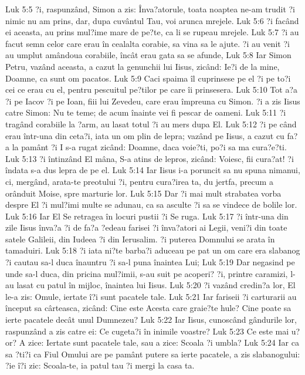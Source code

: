 Luk 5:5  ?i, raspunzând, Simon a zis: Înva?atorule, toata noaptea ne-am trudit ?i nimic nu am prins, dar, dupa cuvântul Tau, voi arunca mrejele.
Luk 5:6  ?i facând ei aceasta, au prins mul?ime mare de pe?te, ca li se rupeau mrejele.
Luk 5:7  ?i au facut semn celor care erau în cealalta corabie, sa vina sa le ajute. ?i au venit ?i au umplut amândoua corabiile, încât erau gata sa se afunde,
Luk 5:8  Iar Simon Petru, vazând aceasta, a cazut la genunchii lui Iisus, zicând: Ie?i de la mine, Doamne, ca sunt om pacatos.
Luk 5:9  Caci spaima îl cuprinsese pe el ?i pe to?i cei ce erau cu el, pentru pescuitul pe?tilor pe care îi prinsesera.
Luk 5:10  Tot a?a ?i pe Iacov ?i pe Ioan, fiii lui Zevedeu, care erau împreuna cu Simon. ?i a zis Iisus catre Simon: Nu te teme; de acum înainte vei fi pescar de oameni.
Luk 5:11  ?i tragând corabiile la ?arm, au lasat totul ?i au mers dupa El.
Luk 5:12  ?i pe când erau într-una din ceta?i, iata un om plin de lepra; vazând pe Iisus, a cazut cu fa?a la pamânt ?i I s-a rugat zicând: Doamne, daca voie?ti, po?i sa ma cura?e?ti.
Luk 5:13  ?i întinzând El mâna, S-a atins de lepros, zicând: Voiesc, fii cura?at! ?i îndata s-a dus lepra de pe el.
Luk 5:14  Iar Iisus i-a poruncit sa nu spuna nimanui, ci, mergând, arata-te preotului ?i, pentru cura?irea ta, du jertfa, precum a orânduit Moise, spre marturie lor.
Luk 5:15  Dar ?i mai mult strabatea vorba despre El ?i mul?imi multe se adunau, ca sa asculte ?i sa se vindece de bolile lor.
Luk 5:16  Iar El Se retragea în locuri pustii ?i Se ruga.
Luk 5:17  ?i într-una din zile Iisus înva?a ?i de fa?a ?edeau farisei ?i înva?atori ai Legii, veni?i din toate satele Galileii, din Iudeea ?i din Ierusalim. ?i puterea Domnului se arata în tamaduiri.
Luk 5:18  ?i iata ni?te barba?i aduceau pe pat un om care era slabanog ?i cautau sa-l duca înauntru ?i sa-l puna înaintea Lui;
Luk 5:19  Dar negasind pe unde sa-l duca, din pricina mul?imii, s-au suit pe acoperi? ?i, printre caramizi, l-au lasat cu patul în mijloc, înaintea lui Iisus.
Luk 5:20  ?i vazând credin?a lor, El le-a zis: Omule, iertate î?i sunt pacatele tale.
Luk 5:21  Iar fariseii ?i carturarii au început sa cârteasca, zicând: Cine este Acesta care graie?te hule? Cine poate sa ierte pacatele decât unul Dumnezeu?
Luk 5:22  Iar Iisus, cunoscând gândurile lor, raspunzând a zis catre ei: Ce cugeta?i în inimile voastre?
Luk 5:23  Ce este mai u?or? A zice: Iertate sunt pacatele tale, sau a zice: Scoala ?i umbla?
Luk 5:24  Iar ca sa ?ti?i ca Fiul Omului are pe pamânt putere sa ierte pacatele, a zis slabanogului: ?ie î?i zic: Scoala-te, ia patul tau ?i mergi la casa ta.
